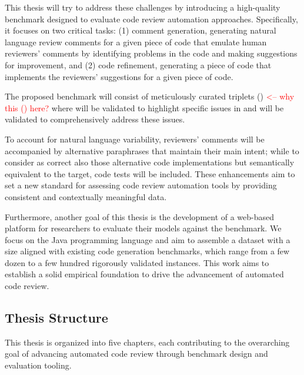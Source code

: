 This thesis will try to address these challenges by introducing a high-quality
benchmark designed to evaluate code review automation approaches.
Specifically, it focuses on two critical tasks: (1) comment generation, \ie
generating natural language review comments for a given piece of code that emulate
human reviewers' comments by identifying problems in the code and making suggestions
for improvement, and (2) code refinement, \ie generating a piece of code that
implements the reviewers' suggestions for a given piece of code.

The proposed benchmark will consist of meticulously curated triplets (\subCode) \textcolor{red}{<-- why this (\subCode) here?}
where \revComment will be validated to highlight specific issues in \subCode and
\revCode will be validated to comprehensively address these issues.

To account for natural language variability, reviewers' comments will be accompanied by
alternative paraphrases that maintain their main intent; while to consider as correct also
those alternative code implementations but semantically equivalent to the target, code tests will
be included. These enhancements aim to set a new standard for assessing code review
automation tools by providing consistent and contextually meaningful data.

Furthermore, another goal of this thesis is the development of a web-based platform for researchers
to evaluate their models against the benchmark. We focus on the Java programming language and aim to
assemble a dataset with a size aligned with existing code generation benchmarks, which range from a
few dozen to a few hundred rigorously validated instances. This work aims to establish a solid
empirical foundation to drive the advancement of automated code review.

\subsection{Thesis Structure}

This thesis is organized into five chapters, each contributing to the overarching goal of advancing
automated code review through benchmark design and evaluation tooling.


